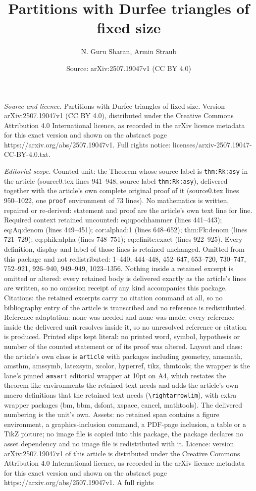 \documentclass[10pt,a4paper]{amsart}
\title[Partitions with Durfee triangles of fixed size]{Partitions with Durfee triangles of fixed size}
\author{N. Guru Sharan, Armin Straub}
\date{Source: arXiv:2507.19047v1 (CC BY 4.0)}
\begin{document}
\maketitle

\noindent\emph{Source and licence.} Partitions with Durfee triangles of fixed size. Version arXiv:2507.19047v1 (CC BY 4.0), distributed under the Creative Commons Attribution 4.0 International licence, as recorded in the arXiv licence metadata for this exact version and shown on the abstract page https://arxiv.org/abs/2507.19047v1. Full rights notice: licenses/arxiv-2507.19047-CC-BY-4.0.txt.\par\smallskip

\noindent\textit{Editorial scope.} Counted unit: the Theorem whose source label is \texttt{thm:Rk:asy} in the article (source0.tex lines 941--948, source label \texttt{thm:Rk:asy}), delivered together with the article's own complete original proof of it (source0.tex lines 950--1022, one \texttt{proof} environment of 73 lines). No mathematics is written, repaired or re-derived: statement and proof are the article's own text line for line. Required context retained uncounted: eq:qpochhammer (lines 441--443); eq:Aq:denom (lines 449--451); cor:alphad:1 (lines 648--652); thm:Fk:denom (lines 721--729); eq:phik:alpha (lines 748--751); eq:cfinite:exact (lines 922--925). Every definition, display and label of those lines is retained unchanged. Omitted from this package and not redistributed: 1--440, 444--448, 452--647, 653--720, 730--747, 752--921, 926--940, 949--949, 1023--1356. Nothing inside a retained excerpt is omitted or altered: every retained body is delivered exactly as the article's lines are written, so no omission receipt of any kind accompanies this package. Citations: the retained excerpts carry no citation command at all, so no bibliography entry of the article is transcribed and no reference is redistributed. Reference adaptation: none was needed and none was made; every reference inside the delivered unit resolves inside it, so no unresolved reference or citation is produced. Printed slips kept literal: no printed word, symbol, hypothesis or number of the counted statement or of its proof was altered. Layout and class: the article's own class is \texttt{article} with packages including geometry, amsmath, amsthm, amssymb, latexsym, xcolor, hyperref, tikz, thmtools; the wrapper is the lane's pinned \texttt{amsart} editorial wrapper at 10pt on A4, which restates the theorem-like environments the retained text needs and adds the article's own macro definitions that the retained text needs (\texttt{\textbackslash rightarrowlim}), with extra wrapper packages (bm, bbm, dsfont, xspace, cancel, mathtools). The delivered numbering is the unit's own. Assets: no retained span contains a figure environment, a graphics-inclusion command, a PDF-page inclusion, a table or a TikZ picture; no image file is copied into this package, the package declares no asset dependency and no image file is redistributed with it. Licence: version arXiv:2507.19047v1 of this article is distributed under the Creative Commons Attribution 4.0 International licence, as recorded in the arXiv licence metadata for this exact version and shown on the abstract page https://arxiv.org/abs/2507.19047v1. A full rights 
\end{document}
